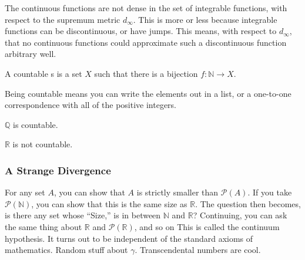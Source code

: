 \documentclass[crop=false,class=article,oneside]{standalone}
\begin{document}
            \begin{example}
                The continuous functions are not dense
                in the set of integrable functions,
                with respect to the supremum metric
                $d_{\infty}$. This is more or less
                because integrable functions can
                be discontinuous, or have jumps. This
                means, with respect to $d_{\infty}$,
                that no continuous functions could
                approximate such a discontinuous function
                arbitrary well.
            \end{example}
            \begin{definition}
                A countable s is a set
                $X$ such that there is a bijection
                $f:\mathbb{N}\rightarrow{X}$.
            \end{definition}
            Being countable means you can write
            the elements out in a list, or a
            one-to-one correspondence with all of
            the positive integers.
            \begin{example}
                $\mathbb{Q}$ is countable.
            \end{example}
            \begin{example}
                $\mathbb{R}$ is not countable.
            \end{example}
        \subsubsection{A Strange Divergence}
            For any set $A$, you can show
            that $A$ is strictly smaller
            than $\mathcal{P}(A)$. If you
            take $\mathcal{P}(\mathbb{N})$,
            you can show that this is the
            same size as $\mathbb{R}$. The
            question then becomes, is there
            any set whose ``Size,'' is in
            between $\mathbb{N}$ and $\mathbb{R}$?
            Continuing, you can ask the same thing
            about $\mathbb{R}$ and
            $\mathcal{P}(\mathbb{R})$, and so on
            This is called the continuum hypothesis.
            It turns out to be independent of
            the standard axioms of mathematics.
            Random stuff about $\gamma$.
            Transcendental numbers are cool.
\end{document}
